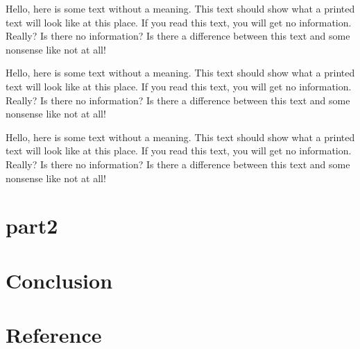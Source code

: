\documentclass[10pt, a4paper,twocolumn,notitlepage]{article} %
\begin{document}
\begin{flushleft}
Hello, here is some text without a meaning.  This text should show what  a printed text will look like at this place.  If you read this text, you will get no information.  Really?  Is there no information?  Is there 
a difference between this text and some nonsense like not at all! 
\end{flushleft}

\begin{flushright}
Hello, here is some text without a meaning.  This text should show what  a printed text will look like at this place.  If you read this text, you will get no information.  Really?  Is there no information?  Is there 
a difference between this text and some nonsense like not at all! 
\end{flushright}

\begin{center}
Hello, here is some text without a meaning.  This text should show what  a printed text will look like at this place.  If you read this text, you will get no information.  Really?  Is there no information?  Is there 
a difference between this text and some nonsense like not at all! 
\end{center}

\lipsum[1-2]

\section{part2} \justify
\lipsum[3-7]

\section{Conclusion}\justify
\lipsum[8-10]

\section{Reference}\justify
\lipsum[9]
\end{document}
